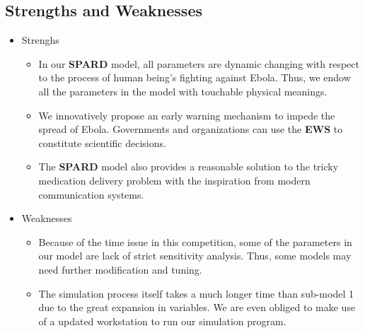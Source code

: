 {\subsection{Strengths and Weaknesses}
\begin{itemize}
  \item Strenghs
  \begin{itemize}
    \item In our \textbf{SPARD} model, all parameters are dynamic changing with respect to the process of human being's fighting against  Ebola. Thus, we endow all the parameters in the model with touchable physical meanings. 
    \item We innovatively propose an early warning mechanism to impede the spread of Ebola. Governments and organizations can use the \textbf{EWS} to constitute scientific decisions.
    \item The \textbf{SPARD} model also provides a reasonable solution to the tricky medication delivery problem with the inspiration from modern communication systems.
  \end{itemize}
  \item Weaknesses
  \begin{itemize}
    \item Because of the time issue in this competition, some of the parameters in our model are lack of strict sensitivity analysis. Thus, some models may need further modification and tuning. 
    \item The simulation process itself takes a much longer time than sub-model 1 due to the great expansion in variables. We are even obliged to make use of a updated workstation to run our simulation program.
    \end{itemize}
\end{itemize}

}

